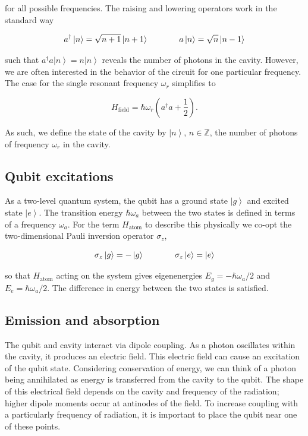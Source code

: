 \documentclass[11 pt, oneside]{book} %
\newcommand{\ket}[1]{\left| #1 \right>} %
\begin{document}
for all possible frequencies. The raising and lowering operators work in the standard way

\begin{equation}
a^\dag\ket{n}=\sqrt{n+1}\ket{n+1} \hspace{1.3cm} a\ket{n}=\sqrt{n}\ket{n-1} 
\end{equation}

such that $a^\dag a\ket{n}=n\ket{n}$ reveals the number of photons in the cavity. However, we are often interested in the behavior of the circuit for one particular frequency. The case for the single resonant  frequency $\omega_r$ simplifies to 

\begin{equation}
H_{\mathrm{field}}=\hbar \omega_r(a^\dag a+\frac{1}{2}).
\end{equation}

As such, we define the state of the cavity by $\ket{n}$, $n \in \mathbb{Z}$, the number of photons of frequency $\omega_r$ in the cavity.

\subsection{Qubit excitations}
As a two-level quantum system, the qubit has a ground state $\ket{g}$ and excited state $\ket{e}$. The transition energy $\hbar \omega_a$ between the two states is defined in terms of a frequency $\omega_a$. For the term $H_{\mathrm{atom}}$ to describe this physically we co-opt the two-dimensional Pauli inversion operator $\sigma_z$,

\begin{equation}
\sigma_z\ket{g}=-\ket{g} \hspace{1.3cm} \sigma_z\ket{e}=\ket{e}
\end{equation}

so that $H_{\mathrm{atom}}$ acting on the system gives eigenenergies $E_g=-\hbar\omega_a/2$ and $E_e=\hbar\omega_a/2$. The difference in energy between the two states is satisfied. 

\subsection{Emission and absorption}\label{sec:Emission}
The qubit and cavity interact via dipole coupling. As a photon oscillates within the cavity, it produces an electric field. This electric field can cause an excitation of the qubit state. Considering conservation of energy, we can think of a photon being annihilated as energy is transferred from the cavity to the qubit. The shape of this electrical field depends on the cavity and frequency of the radiation; higher dipole moments occur at antinodes of the field. To increase coupling with a particularly frequency of radiation, it is important to place the qubit near one of these points.   
\end{document}
